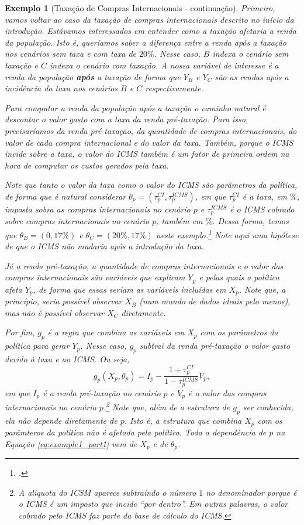 \documentclass[12pt, a4paper, openany]{book}
\numberwithin{equation}{chapter}
\numberwithin{table}{chapter}
\numberwithin{figure}{chapter}
\theoremstyle{break}
\newtheorem{exemplo}{Exemplo}
\begin{document}
\begin{exemplo}[Taxação de Compras Internacionais - continuação]
\label{ex:ci_taxation}
Primeiro, vamos voltar ao caso da taxação de compras internacionais descrito no início da introdução. Estávamos interessados em entender como a taxação afetaria a renda da população. Isto é, queríamos saber a diferença entre a renda após a taxação nos cenários sem taxa e com taxa de $20\%$. Nesse caso, $B$ indexa o cenário sem taxação e $C$ indexa o cenário com taxação. A nossa variável de interesse é a renda da população \textbf{após} a taxação de forma que $Y_B$ e $Y_C$ são as rendas após a incidência da taxa nos cenários $B$ e $C$ respectivamente. 

Para computar a renda da população após a taxação o caminho natural é descontar o valor gasto com a taxa da renda pré-taxação. Para isso, precisaríamos da renda pré-taxação, da quantidade de compras internacionais, do valor de cada compra internacional e do valor da taxa. Também, porque o ICMS incide sobre a taxa, o valor do ICMS também é um fator de primeira ordem na hora de computar os custos gerados pela taxa. 

Note que tanto o valor da taxa como o valor do ICMS são parâmetros da política, de forma que é natural considerar $\theta_p=(\tau^{CI}_p, \tau^{ICMS}_p)$, em que $\tau^{CI}_p$ é a taxa, em $\%$, imposta sobra as compras internacionais no cenário $p$ e $\tau^{ICMS}_p$ é o ICMS cobrado sobre compras internacionais no cenário $p$, também em $\%$. Dessa forma, temos que $\theta_B=(0, 17\%)$ e $\theta_C=(20\%, 17\%)$ neste exemplo.\footnote{\textcite{folha_remessas}.} Note aqui uma hipótese de que o ICMS não mudaria após a introdução da taxa. 

Já a renda pré-taxação, a quantidade de compras internacionais e o valor das compras internacionais são variáveis que explicam $Y_p$ e pelas quais a política afeta $Y_p$, de forma que essas seriam as variáveis incluídas em $X_p$. Note que, a princípio, seria possível observar $X_B$ (num mundo de dados ideais pelo menos), mas não é possível observar $X_C$ diretamente. 

Por fim, $g_p$ é a regra que combina as variáveis em $X_p$ com os parâmetros da política para gerar $Y_p$. Nesse caso, $g_p$ subtrai da renda pré-taxação o valor gasto devido à taxa e ao ICMS. Ou seja, 
\begin{equation}
\label{eq:example1_part1}
g_p(X_p, \theta_p)=I_p - \frac{1+\tau^{CI}_p}{1-\tau^{ICMS}_p}V_p, 
\end{equation}
em que $I_p$ é a renda pré-taxação no cenário $p$ e $V_p$ é o valor das compras internacionais no cenário $p$.\footnote{A alíquota do ICSM aparece subtraindo o número $1$ no denominador porque é o ICMS é um imposto que incide ``por dentro''. Em outras palavras, o valor cobrado pelo ICMS faz parte da base de cálculo do ICMS.} Note que, além de a estrutura de $g_p$ ser conhecida, ela não depende diretamente de $p$. Isto é, a estrutura que combina $X_p$ com os parâmteros da política não é afetada pela política. Toda a dependência de $p$ na Equação \eqref{eq:example1_part1} vem de $X_p$ e de $\theta_p$. 


\end{exemplo}
\end{document}
